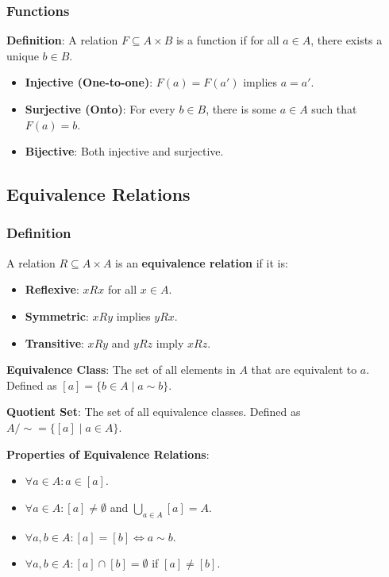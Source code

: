\subsubsection*{Functions}
\textbf{Definition}: A relation $F \subseteq A \times B$ is a function if for all $a \in A$, there exists a unique $b \in B$.
\begin{itemize}
    \item \textbf{Injective (One-to-one)}: $F(a) = F(a')$ implies $a = a'$.
    \item \textbf{Surjective (Onto)}: For every $b \in B$, there is some $a \in A$ such that $F(a) = b$.
    \item \textbf{Bijective}: Both injective and surjective.
\end{itemize}

\subsection{Equivalence Relations}

\subsubsection*{Definition}
A relation $R \subseteq A \times A$ is an \textbf{equivalence relation} if it is:
\begin{itemize}
    \item \textbf{Reflexive}: $x R x$ for all $x \in A$.
    \item \textbf{Symmetric}: $x R y$ implies $y R x$.
    \item \textbf{Transitive}: $x R y$ and $y R z$ imply $x R z$.
\end{itemize}

\textbf{Equivalence Class}: The set of all elements in $A$ that are equivalent to $a$. Defined as $[a] = \{b \in A \mid a \sim b\}$.

\textbf{Quotient Set}: The set of all equivalence classes. Defined as $A / \sim = \{[a] \mid a \in A\}$.

\textbf{Properties of Equivalence Relations}:
\begin{itemize}
    \item $\forall a \in A: a \in [a]$.
    \item $\forall a \in A: [a] \neq \emptyset$ and $\bigcup\limits_{a \in A} [a] = A$.
    \item $\forall a,b \in A: [a] = [b] \iff a \sim b$.
    \item $\forall a,b \in A: [a] \cap [b] = \emptyset$ if $[a] \neq [b]$.
\end{itemize}

